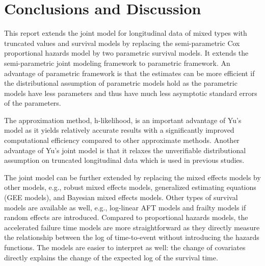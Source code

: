 \section{Conclusions and Discussion}
\label{sec:discuss}

This report extends the joint model for longitudinal data of mixed types with truncated values and survival models by replacing the semi-parametric Cox proportional hazards model by two parametric survival models. It extends the semi-parametric joint modeling framework to parametric framework. An advantage of parametric framework is that the estimates can be more efficient if the distributional assumption of parametric models hold as the parametric models have less parameters and thus have much less asymptotic standard errors of the parameters. 

The approximation method, h-likelihood, is an important advantage of Yu's model as it yields relatively accurate results with a significantly improved computational efficiency compared to other approximate methods.
Another advantage of Yu's joint model is that it relaxes the unverifiable distributional assumption on truncated longitudinal data which is used in previous studies.

The joint model can be further extended by replacing the mixed effects models by other models, e.g., robust mixed effects models, generalized estimating equations (GEE models), and Bayesian mixed effects models. Other types of survival models are available as well, e.g., log-linear AFT models and frailty models if random effects are introduced. Compared to proportional hazards models, the accelerated failure time models are more straightforward as they directly measure the relationship between the log of time-to-event without introducing the hazards functions. The models are easier to interpret as well: the change of covariates directly explains the change of the expected log of the survival time. 